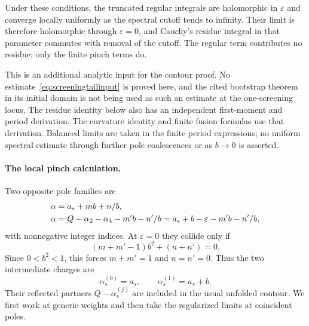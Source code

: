 \documentclass[11pt,a4paper]{article}
\numberwithin{equation}{section}
\theoremstyle{definition}
\theoremstyle{remark}
\begin{document}
Under these conditions, the truncated regular integrals are
holomorphic in $\varepsilon$ and converge locally uniformly as the
spectral cutoff tends to infinity. Their limit is therefore
holomorphic through $\varepsilon=0$, and Cauchy's residue integral
in that parameter commutes with removal of the cutoff. The regular
term contributes no residue; only the finite pinch terms do.

This is an additional analytic input for the contour proof. No
estimate~\eqref{eq:screeningtailinput} is proved here, and the cited
bootstrap theorem in its initial domain is not being used as such
an estimate at the one-screening locus. The residue identity below
also has an independent first-moment and period derivation. The
curvature identity and finite fusion formulas use that derivation.
Balanced limits are taken in the finite period expressions; no
uniform spectral estimate through further pole coalescences or as
$b\to0$ is asserted.

\paragraph{The local pinch calculation.}
Two opposite pole families are
\begin{align}
 \alpha&=a_s+mb+n/b,\notag\\
 \alpha&=Q-\alpha_2-\alpha_4-m'b-n'/b
        =a_s+b-\varepsilon-m'b-n'/b,
 \label{eq:screeningpolefamilies}
\end{align}
with nonnegative integer indices. At $\varepsilon=0$ they collide
only if
\[
 (m+m'-1)b^2+(n+n')=0.
\]
Since $0<b^2<1$, this forces $m+m'=1$ and $n=n'=0$.
Thus the two intermediate charges are
\begin{equation}
 \boxed{\quad \alpha_s^{(0)}=a_s,\qquad
                 \alpha_s^{(1)}=a_s+b.\quad}
 \label{eq:twoscreeningchannels}
\end{equation}
Their reflected partners $Q-\alpha_s^{(j)}$ are included in the
usual unfolded contour. We first work at generic weights and
then take the regularized limits at coincident poles.
\end{document}
